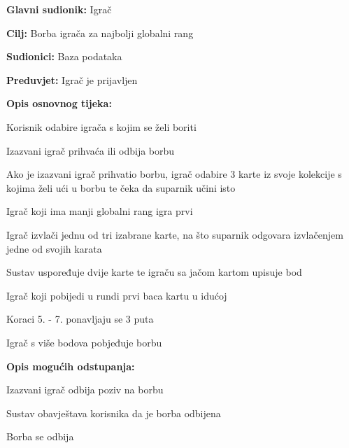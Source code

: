 					\noindent {}
					\begin{packed_item}
						
						\item \textbf{Glavni sudionik: }Igrač
						\item  \textbf{Cilj:} Borba igrača za najbolji globalni rang
						\item  \textbf{Sudionici:} Baza podataka
						\item  \textbf{Preduvjet:} Igrač je prijavljen
						\item  \textbf{Opis osnovnog tijeka:}
						
						\item[] \begin{packed_enum}
							
							\item Korisnik odabire igrača s kojim se želi boriti
							\item Izazvani igrač prihvaća ili odbija borbu
							\item Ako je izazvani igrač prihvatio borbu, igrač odabire 3 karte iz svoje kolekcije s kojima želi ući u borbu te čeka da suparnik učini isto 
							\item Igrač koji ima manji globalni rang igra prvi 
							\item Igrač izvlači jednu od tri izabrane karte, na što suparnik odgovara izvlačenjem jedne od svojih karata
							\item Sustav uspoređuje dvije karte te igraču sa jačom kartom upisuje bod
							\item Igrač koji pobijedi u rundi prvi baca kartu u idućoj
							\item Koraci 5. - 7. ponavljaju se 3 puta
							\item Igrač s više bodova pobjeđuje borbu
							
						\end{packed_enum}
					
					\item  \textbf{Opis mogućih odstupanja:}
					
					\item[] \begin{packed_item}
						
						\item[2.a] Izazvani igrač odbija poziv na borbu
						\item[] \begin{packed_enum}
							
							\item Sustav obavještava korisnika da je borba odbijena
							\item Borba se odbija
							
						\end{packed_enum}
					\end{packed_item}
					\end{packed_item}
				
